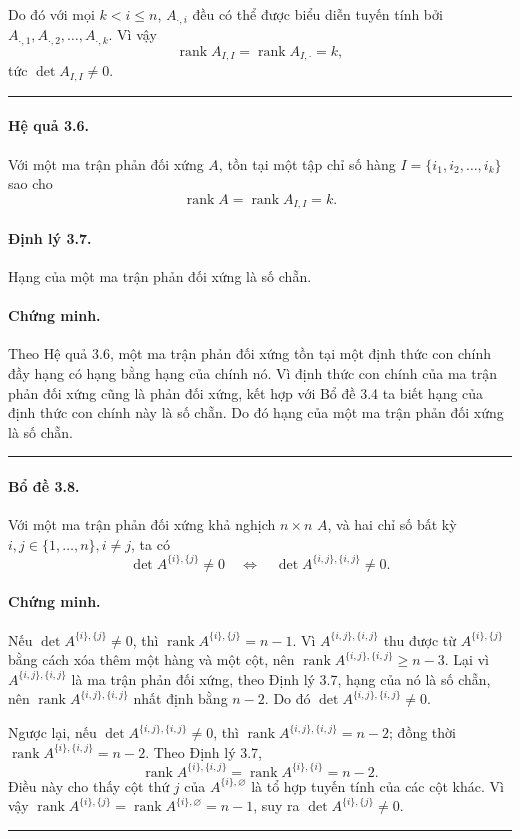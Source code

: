\documentclass[11pt]{article}
\newcommand{\rank}{\operatorname{rank}}
\newcommand{\qedmark}{\hfill\rule{0.7ex}{0.7ex}}
\begin{document}
Do đó với mọi \(k<i\le n\), \(A_{\cdot,i}\) đều có thể được biểu diễn tuyến
tính bởi \(A_{\cdot,1},A_{\cdot,2},\ldots,A_{\cdot,k}\). Vì vậy
\[
  \rank A_{I,I}=\rank A_{I,\cdot}=k,
\]
tức \(\det A_{I,I}\ne 0\). \qedmark

\paragraph{Hệ quả 3.6.}
Với một ma trận phản đối xứng \(A\), tồn tại một tập chỉ số hàng
\(I=\{i_1,i_2,\ldots,i_k\}\) sao cho
\[
  \rank A=\rank A_{I,I}=k.
\]

\paragraph{Định lý 3.7.}
Hạng của một ma trận phản đối xứng là số chẵn.

\paragraph{Chứng minh.}
Theo Hệ quả 3.6, một ma trận phản đối xứng tồn tại một định thức con chính đầy
hạng có hạng bằng hạng của chính nó. Vì định thức con chính của ma trận phản
đối xứng cũng là phản đối xứng, kết hợp với Bổ đề 3.4 ta biết hạng của định
thức con chính này là số chẵn. Do đó hạng của một ma trận phản đối xứng là số
chẵn. \qedmark

\paragraph{Bổ đề 3.8.}
Với một ma trận phản đối xứng khả nghịch \(n\times n\) \(A\), và hai chỉ số
bất kỳ \(i,j\in\{1,\ldots,n\}, i\ne j\), ta có
\[
  \det A^{\{i\},\{j\}}\ne 0
  \quad\Longleftrightarrow\quad
  \det A^{\{i,j\},\{i,j\}}\ne 0.
\]

\paragraph{Chứng minh.}
Nếu \(\det A^{\{i\},\{j\}}\ne 0\), thì
\(\rank A^{\{i\},\{j\}}=n-1\). Vì
\(A^{\{i,j\},\{i,j\}}\) thu được từ \(A^{\{i\},\{j\}}\) bằng cách xóa thêm một
hàng và một cột, nên \(\rank A^{\{i,j\},\{i,j\}}\ge n-3\). Lại vì
\(A^{\{i,j\},\{i,j\}}\) là ma trận phản đối xứng, theo Định lý 3.7, hạng của
nó là số chẵn, nên \(\rank A^{\{i,j\},\{i,j\}}\) nhất định bằng \(n-2\). Do đó
\(\det A^{\{i,j\},\{i,j\}}\ne 0\).

Ngược lại, nếu \(\det A^{\{i,j\},\{i,j\}}\ne 0\), thì
\(\rank A^{\{i,j\},\{i,j\}}=n-2\); đồng thời
\(\rank A^{\{i\},\{i,j\}}=n-2\). Theo Định lý 3.7,
\[
  \rank A^{\{i\},\{i,j\}}=\rank A^{\{i\},\{i\}}=n-2.
\]
Điều này cho thấy cột thứ \(j\) của \(A^{\{i\},\varnothing}\) là tổ hợp tuyến
tính của các cột khác. Vì vậy
\(\rank A^{\{i\},\{j\}}=\rank A^{\{i\},\varnothing}=n-1\), suy ra
\(\det A^{\{i\},\{j\}}\ne 0\). \qedmark
\end{document}

